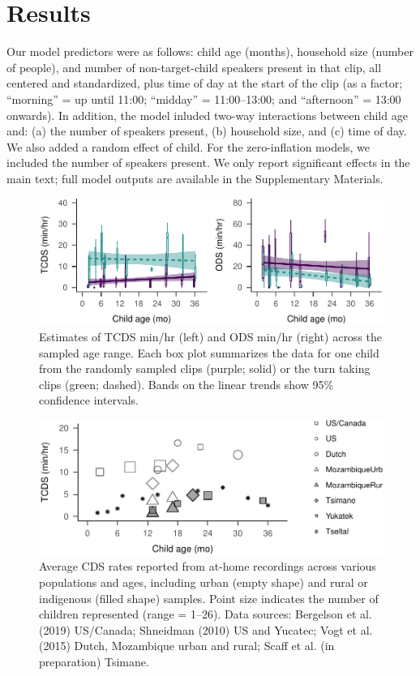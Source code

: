 \documentclass[floatsintext,man]{apa6}
\theoremstyle{definition}
\theoremstyle{definition}
\theoremstyle{definition}
\theoremstyle{remark}
\begin{document}
\section{Results}\label{results}

Our model predictors were as follows: child age (months), household size
(number of people), and number of non-target-child speakers present in
that clip, all centered and standardized, plus time of day at the start
of the clip (as a factor; \enquote{morning} = up until 11:00;
\enquote{midday} = 11:00--13:00; and \enquote{afternoon} = 13:00
onwards). In addition, the model inluded two-way interactions between
child age and: (a) the number of speakers present, (b) household size,
and (c) time of day. We also added a random effect of child. For the
zero-inflation models, we included the number of speakers present. We
only report significant effects in the main text; full model outputs are
available in the Supplementary Materials.

\begin{figure}
\centering
\includegraphics{Tseltal-CLE_files/figure-latex/fig3-1.pdf}
\caption{\label{fig:fig3}Estimates of TCDS min/hr (left) and ODS min/hr
(right) across the sampled age range. Each box plot summarizes the data
for one child from the randomly sampled clips (purple; solid) or the
turn taking clips (green; dashed). Bands on the linear trends show 95\%
confidence intervals.}
\end{figure}

\begin{figure}
\centering
\includegraphics{Tseltal-CLE_files/figure-latex/fig4-1.pdf}
\caption{\label{fig:fig4}Average CDS rates reported from at-home recordings
across various populations and ages, including urban (empty shape) and
rural or indigenous (filled shape) samples. Point size indicates the
number of children represented (range = 1--26). Data sources: Bergelson
et al. (2019) US/Canada; Shneidman (2010) US and Yucatec; Vogt et al.
(2015) Dutch, Mozambique urban and rural; Scaff et al. (in preparation)
Tsimane.}
\end{figure}
\end{document}
